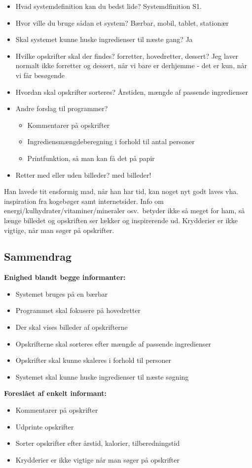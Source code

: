 \begin{description}
\begin{itemize}[noitemsep]
\item Hvad systemdefinition kan du bedst lide? Systemdfinition S1.
\item Hvor ville du bruge sådan et system? Bærbar, mobil, tablet, stationær
\item Skal systemet kunne huske ingredienser til næste gang? Ja
\item Hvilke opskrifter skal der findes? forretter, hovedretter, dessert? Jeg laver normalt ikke forretter og dessert, når vi bare er derhjemme - det er kun, når vi får besøgende
\item Hvordan skal opskrifter sorteres? Årstiden, mængde af passende ingredienser
\item Andre forslag til programmer?
\begin{itemize}[noitemsep]
\item Kommentarer på opskrifter
\item Ingrediensmængdeberegning i forhold til antal personer
\item Printfunktion, så man kan få det på papir
\end{itemize}
\item Retter med eller uden billeder? med billeder!
\end{itemize}

Han lavede tit ensformig mad, når han har tid, kan noget nyt godt laves vha. inspiration fra kogebøger samt internetsider. Info om energi/kulhydrater/vitaminer/mineraler osv.\ betyder ikke så meget for ham, så længe billedet og opskriften ser lækker og inspirerende ud. Krydderier er ikke vigtige, når man søger på opskrifter.
\end{description}

\subsection{Sammendrag}

\textbf{Enighed blandt begge informanter:}
\begin{itemize}[noitemsep]
\item Systemet bruges på en bærbar
\item Programmet skal fokusere på hovedretter
\item Der skal vises billeder af opskrifterne
\item Opskrifterne skal sorteres efter mængde af passende ingredienser
\item Opskrifter skal kunne skaleres i forhold til personer
\item Systemet skal kunne huske ingredienser til næste søgning
\end{itemize} 

\textbf{Foreslået af enkelt informant:}
\begin{itemize}[noitemsep]
\item Kommentarer på opskrifter
\item Udprinte opskrifter
\item Sorter opskrifter efter årstid, kalorier, tilberedningstid
\item Krydderier er ikke vigtige når man søger på opskrifter
\end{itemize}

